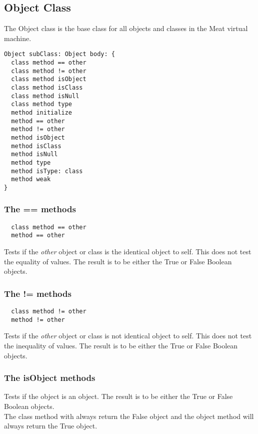 \subsection {Object Class}

\indent{}The Object class is the base class for all objects and classes in the
Meat virtual machine.

\begin{lstlisting}
Object subClass: Object body: {
  class method == other
  class method != other
  class method isObject
  class method isClass
  class method isNull
  class method type
  method initialize
  method == other
  method != other
  method isObject
  method isClass
  method isNull
  method type
  method isType: class
  method weak
}
\end{lstlisting}

\subsubsection {The == methods}
\begin{lstlisting}
  class method == other
  method == other
\end{lstlisting}
\indent{}Tests if the \textit{other} object or class is the identical object to self.
This does not test the equality of values. The result is to be either the True
or False Boolean objects.

\hfill
\subsubsection {The != methods}
\begin{lstlisting}
  class method != other
  method != other
\end{lstlisting}
Tests if the \textit{other} object or class is not identical object to self.
This does not test the inequality of values. The result is to be either the
True or False Boolean objects.

\hfill
\subsubsection {The isObject methods}

Tests if the object is an object. The result is to be either the
True or False Boolean objects.\\

The class method with always return the False object and the object method will
always return the True object.

\hfill
